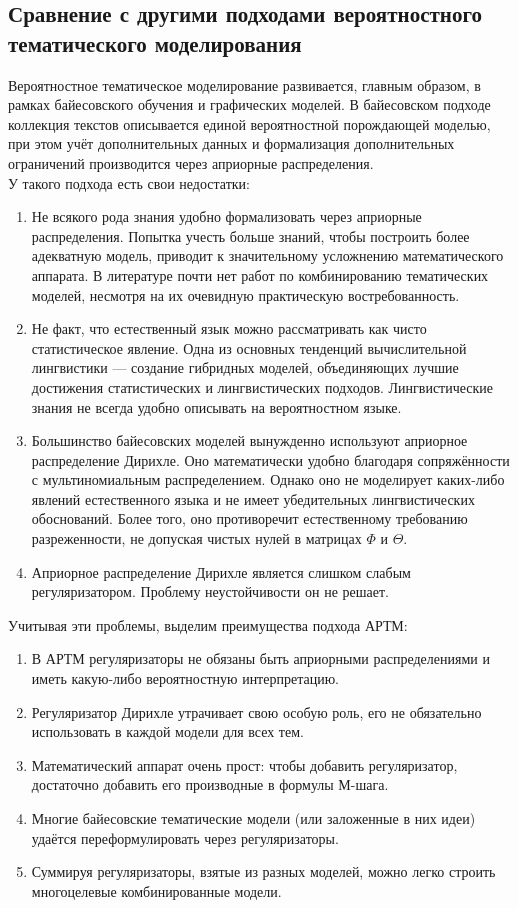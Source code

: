 \documentclass[12pt]{article}
\begin{document}
\subsection{Сравнение с другими подходами вероятностного тематического моделирования}
Вероятностное тематическое моделирование развивается, главным образом, в рамках байесовского обучения и графических моделей. В байесовском подходе коллекция текстов описывается единой вероятностной порождающей моделью, при этом учёт дополнительных данных и формализация дополнительных ограничений производится через априорные распределения.\\
У такого подхода есть свои недостатки:
\begin{enumerate}
\item Не всякого рода знания удобно формализовать через априорные распределения. Попытка учесть больше знаний, чтобы построить более адекватную модель, приводит к значительному усложнению математического аппарата. В литературе почти нет работ по комбинированию тематических моделей, несмотря на их очевидную практическую востребованность.
\item Не факт, что естественный язык можно рассматривать как чисто статистическое явление. Одна из основных тенденций вычислительной лингвистики --- создание гибридных моделей, объединяющих лучшие достижения статистических и лингвистических подходов. Лингвистические знания не всегда удобно описывать на вероятностном языке.
\item Большинство байесовских моделей вынужденно используют априорное распределение Дирихле\cite{ldadef1}. Оно математически удобно благодаря сопряжённости с мультиномиальным распределением. Однако оно не моделирует каких-либо явлений естественного языка и не имеет убедительных лингвистических обоснований. Более того, оно противоречит естественному требованию разреженности, не допуская чистых нулей в матрицах $\Phi$  и $\Theta$.
\item Априорное распределение Дирихле является слишком слабым регуляризатором. Проблему неустойчивости он не решает.
\end{enumerate}
Учитывая эти проблемы, выделим преимущества подхода АРТМ:
\begin{enumerate}
\item В АРТМ регуляризаторы не обязаны быть априорными распределениями и иметь какую-либо вероятностную интерпретацию.
\item Регуляризатор Дирихле утрачивает свою особую роль, его не обязательно использовать в каждой модели для всех тем.
\item Математический аппарат очень прост: чтобы добавить регуляризатор, достаточно добавить его производные в формулы М-шага.
\item Многие байесовские тематические модели (или заложенные в них идеи) удаётся переформулировать через регуляризаторы.
\item Суммируя регуляризаторы, взятые из разных моделей, можно легко строить многоцелевые комбинированные модели.
\end{enumerate}
\end{document}
